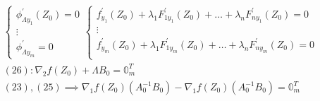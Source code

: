 \documentclass[main]{subfiles}
\begin{document}
\begin{longProof}
\begin{gather*}
\begin{cases}
                \phi^\prime_{\Lambda y_1} (Z_0) = 0 \\
                \vdots \\
                \phi^\prime_{\Lambda y_m} = 0
              \end{cases}
              \begin{cases}
                f^\prime_{y_1}(Z_0) + \lambda_1 F^\prime_{1y_1}(Z_0) + \ldots + \lambda_n F^\prime_{ny_1}(Z_0) = 0 \\
                \vdots \\
                f^\prime_{y_m}(Z_0) + \lambda_1 F^\prime_{1y_m}(Z_0) + \ldots + \lambda_n F^\prime_{ny_m}(Z_0) = 0 \\
              \end{cases} \tag{26} \\
              (26): \nabla_2 f(Z_0) + \Lambda B_0 = \mathbb{0}^T_m \tag{?} \\
              (23), (25) \implies \nabla_1 f(Z_0)(A_0^{-1}B_0) - \nabla_1 f(Z_0)(A_0^{-1}B_0) = \mathbb{0}^T_m
        \end{gather*}
        \end{longProof}
\end{document}
